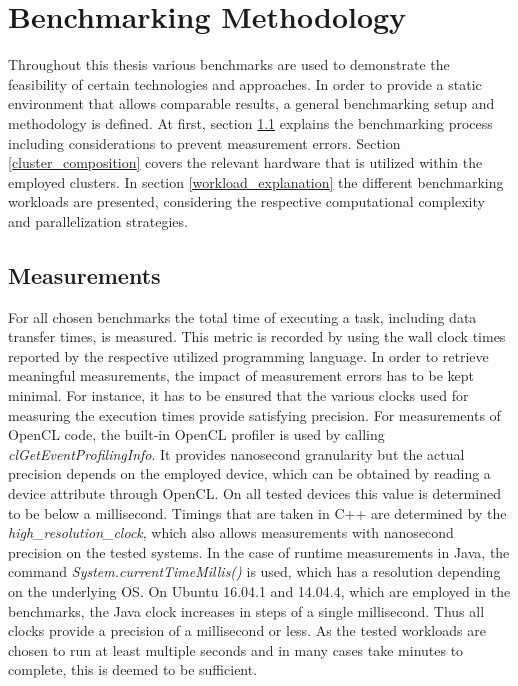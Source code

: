 \chapter{Benchmarking Methodology}
\label{benchmarking_methodology}
Throughout this thesis various benchmarks are used to demonstrate the feasibility of certain technologies and approaches. In order to provide a static environment that allows comparable results, a general benchmarking setup and methodology is defined. At first, section \ref{measurements} explains the benchmarking process including considerations to prevent measurement errors. Section \ref{cluster_composition} covers the relevant hardware that is utilized within the employed clusters. In section \ref{workload_explanation} the different benchmarking workloads are presented, considering the respective computational complexity and parallelization strategies.
\section{Measurements}
\label{measurements}
For all chosen benchmarks the total time of executing a task, including data transfer times, is measured. This metric is recorded by using the wall clock times reported by the respective utilized programming language. In order to retrieve meaningful measurements, the impact of measurement errors has to be kept minimal. For instance, it has to be ensured that the various clocks used for measuring the execution times provide satisfying precision. For measurements of OpenCL code, the built-in OpenCL profiler is used by calling \textit{clGetEventProfilingInfo}. It provides nanosecond granularity but the actual precision depends on the employed device\cite{cl_profiling}, which can be obtained by reading a device attribute through OpenCL. On all tested devices this value is determined to be below a millisecond. Timings that are taken in C++ are determined by the \textit{high\_resolution\_clock}, which also allows measurements with nanosecond precision on the tested systems. In the case of runtime measurements in Java, the command \textit{System.currentTimeMillis()} is used, which has a resolution depending on the underlying OS\cite{oracle_system}. On Ubuntu 16.04.1 and 14.04.4, which are employed in the benchmarks, the Java clock increases in steps of a single millisecond. Thus all clocks provide a precision of a millisecond or less. As the tested workloads are chosen to run at least multiple seconds and in many cases take minutes to complete, this is deemed to be sufficient.

